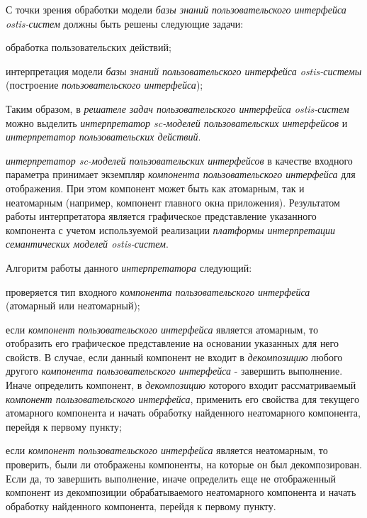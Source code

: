 \bigskip

С точки зрения обработки модели \textit{базы знаний пользовательского интерфейса ostis-систем} должны быть решены следующие задачи:
\begin{textitemize}
	\item обработка пользовательских действий;
	\item интерпретация модели \textit{базы знаний пользовательского интерфейса ostis-системы} (построение \textit{пользовательского интерфейса});
\end{textitemize}

Таким образом, в \textit{решателе задач пользовательского интерфейса ostis-систем} можно выделить \textit{интерпретатор sc-моделей пользовательских интерфейсов} и \textit{интерпретатор пользовательских действий}.

\textit{интерпретатор sc-моделей пользовательских интерфейсов} в качестве входного параметра принимает экземпляр \textit{компонента пользовательского интерфейса} для отображения. При этом компонент может быть как атомарным, так и неатомарным (например, компонент главного окна приложения). Результатом работы интерпретатора является графическое представление указанного компонента с учетом используемой реализации \textit{платформы интерпретации семантических моделей ostis-систем}.

Алгоритм работы данного \textit{интерпретатора} следующий:
\begin{textitemize}
	\item проверяется тип входного \textit{компонента пользовательского интерфейса} (атомарный или неатомарный);
	\item если \textit{компонент пользовательского интерфейса} является атомарным, то отобразить его графическое представление на основании указанных для него свойств. В случае, если данный компонент не входит в \textit{декомпозицию} любого другого \textit{компонента пользовательского интерфейса} - завершить выполнение. Иначе определить компонент, в \textit{декомпозицию} которого входит рассматриваемый \textit{компонент пользовательского интерфейса}, применить его свойства для текущего атомарного компонента и начать обработку найденного неатомарного компонента, перейдя к первому пункту;
	\item если \textit{компонент пользовательского интерфейса} является неатомарным, то проверить, были ли отображены компоненты, на которые он был декомпозирован. Если да, то завершить выполнение, иначе определить еще не отображенный компонент из декомпозиции обрабатываемого неатомарного компонента и начать обработку найденного компонента, перейдя к первому пункту.
\end{textitemize}

